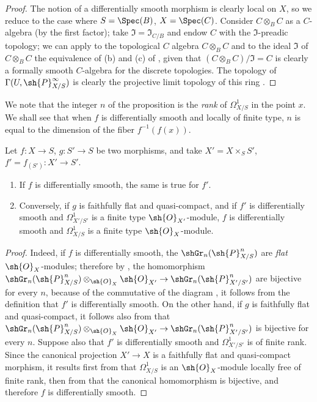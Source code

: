 \begin{proof}
The notion of a differentially smooth morphism is clearly local on $X$, so we reduce to the case where $S = \Spec(B)$, $X = \Spec(C)$.
Consider $C \otimes_B C$ as a $C$-algebra (by the first factor);
take $\mathfrak{I} = \mathfrak{I}_{C/B}$ and endow $C$ with the $\mathfrak{I}$-preadic topology;
we can apply to the topological $C$ algebra $C \otimes_B C$ and to the ideal $\mathfrak{I}$ of $C \otimes_B C$ the equivalence of (b) and (c) of , given that $(C \otimes_B C)/\mathfrak{I} = C$ is clearly a formally smooth $C$-algebra for the discrete topologies.
The topology of $\Gamma(U, \sh{P}_{X/S}^\infty)$ is clearly the projective limit topology of this ring .
\end{proof}

We note that the integer $n$ of the proposition  is the \emph{rank} of $\Omega_{X/S}^1$ in the point $x$.
We shall see  that when $f$ is differentially smooth and locally of finite type, $n$ is equal to the dimension of the fiber $f^{-1}(f(x))$. 

\begin{proposition}[16.10.4]
\label{IV.16.10.4}
Let $f:X \to S$, $g:S' \to S$ be two morphisms, and take $X' = X \times_S S'$, $f' = f_{(S')}:X' \to S'$.
\begin{enumerate}
  \item[\rm{(i)}] If $f$ is differentially smooth, the same is true for $f'$. 
  \item[\rm{(ii)}] Conversely, if $g$ is faithfully flat and quasi-compact, and if $f'$ is differentially smooth and $\Omega_{X'/S'}^1$ is a finite type $\sh{O}_{X'}$-module, $f$ is differentially smooth and $\Omega_{X/S}^1$ is a finite type $\sh{O}_X$-module.
\end{enumerate}
\end{proposition}

\begin{proof}
Indeed, if $f$ is differentially smooth, the $\shGr_n(\sh{P}_{X/S}^n)$ are \emph{flat} $\sh{O}_X$-modules;
therefore by , the homomorphism $\shGr_n(\sh{P}_{X/S}^n) \otimes_{\sh{O}_X} \sh{O}_{X'} \to \shGr_n(\sh{P}_{X'/S'}^n)$ are bijective for every $n$, because of the commutative of the diagram , it follows from the definition  that $f'$ is differentially smooth.
On the other hand, if $g$ is faithfully flat and quasi-compact, it follows also from  that $\shGr_n(\sh{P}_{X/S}^n) \otimes_{\sh{O}_X} \sh{O}_{X'} \to \shGr_n(\sh{P}_{X'/S'}^n)$ is bijective for every $n$.
Suppose also that $f'$ is differentially smooth and $\Omega_{X'/S'}^1$ is of finite rank.
Since the canonical projection $X' \to X$ is a faithfully flat and quasi-compact morphism, it results first from  that $\Omega_{X/S}^1$ is an $\sh{O}_X$-module locally free of finite rank, then from  that the canonical homomorphism  is bijective, and therefore $f$ is differentially smooth.
\end{proof}


